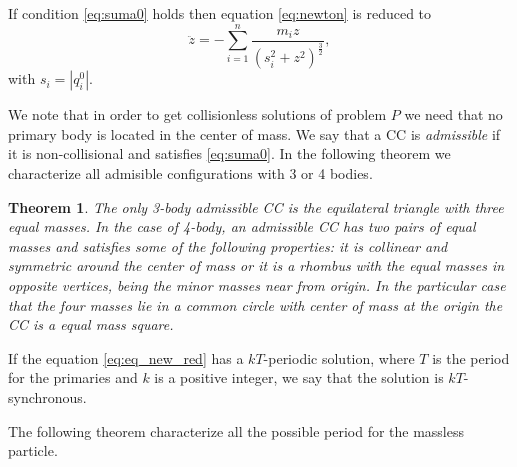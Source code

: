 \documentclass[twoside]{article}
\newtheorem{thm}{Theorem}[section]
\theoremstyle{remark}
\begin{document}
If condition \eqref{eq:suma0} holds then equation \eqref{eq:newton} is reduced to
\begin{equation}\label{eq:eq_new_red}
 \ddot{z}=-\sum_{i=1 }^n\frac{m_iz}{(s_i^2+z^2)^{\frac32}},
\end{equation}
with  $s_i=|q_i^0|$.




We note that in order to get collisionless solutions of problem $P$ we need that no primary body is located in the center of mass. We say that a
CC is \emph{admissible} if it is non-collisional and satisfies \eqref{eq:suma0}. In the following theorem we characterize all admisible configurations with 3 or 4 bodies.

\begin{thm}\label{thm:caracterizacion}
The only 3-body admissible CC is the equilateral triangle with three equal masses. In the case of 4-body, an admissible CC  has two pairs of equal masses and satisfies some of the following properties: it is collinear and symmetric around the center of mass or it is a rhombus with the equal masses in opposite vertices, being the minor masses near from origin. In the particular case that the four masses  lie in a common circle with center of mass at the origin the CC is a  equal mass square.
\end{thm}

If the equation \eqref{eq:eq_new_red} has a $kT$-periodic solution, where $T$ is the period for the primaries and $k$ is a positive integer, we say that the solution is  $kT$-synchronous.

The following theorem characterize all the possible period for the massless particle.
\end{document}
